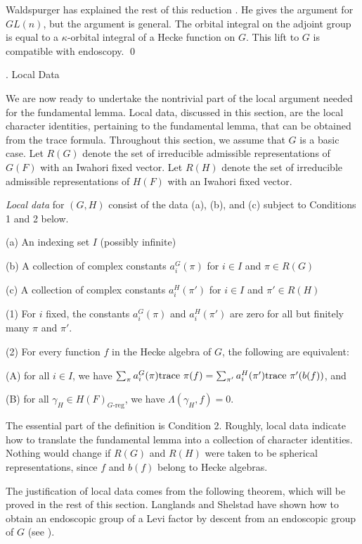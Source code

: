 Waldspurger has explained the rest of this reduction \cite{W,3.1.2}.  He
gives the argument for $GL(n)$, but the argument is general.
The orbital integral on the adjoint group is equal 
to a $\kappa$-orbital integral of a 
Hecke function on $G$.  This lift to $G$ is compatible with endoscopy.
\qed
\enddemo


. Local Data\endhead

We are now ready to undertake the nontrivial part of the local argument
needed for the fundamental lemma. 
Local data, discussed in this section, are the local character
identities,
 pertaining to the fundamental lemma, that can be obtained
from the trace formula.  Throughout this section, we assume
that $G$ is a basic case.
 Let $R(G)$ denote the set of 
 irreducible admissible representations of
 $G(F)$ with an Iwahori fixed vector.  Let $R(H)$ denote the set 
 of irreducible admissible representations of $H(F)$ with an
 Iwahori fixed vector.

  {\it Local data\/}  for $(G,H)$ consist of
 the data (a), (b), and (c) 
subject to Conditions 1 and 2 below.
 \item{(a)} An indexing set $I$ (possibly infinite) 
 \item{(b)} A collection of complex constants $a_i^G(\pi)$ for $i\in I$
 and $\pi\in R(G)$
 \item{(c)} A collection of complex constants $a_i^H(\pi')$ for
 $i\in I$ and $\pi'\in R(H)$
 \item{(1)}
 For $i$ fixed, the constants $a_i^G(\pi)$ and
 $a_i^H(\pi')$ are zero for all but finitely many $\pi$ and $\pi'$.
 \item{(2)} For every function $f$ in the Hecke algebra of $G$,
 the following are equivalent:
 \item{(A)} for all $i\in I$, we have $\sum_\pi a^G_i(\pi)\text{trace\,}\,\pi(f) =
	\sum_{\pi'} a_i^H(\pi')\text{trace\,}\,\pi'(b(f))$, and
\item{(B)} for all $\gamma_H\in H(F)_{G\text{-reg}}$, we have $\Lambda(\gamma_H,f)=0$.
\enddefinition

The essential part of the definition is Condition 2.  Roughly, local
data indicate how to translate the fundamental lemma
into a collection of character identities.
Nothing would change if $R(G)$ and $R(H)$ were
taken to be spherical representations, since $f$ and
$b(f)$ belong to Hecke algebras.



The justification of local data 
comes from the following theorem, which
will be proved in the rest of this section.
Langlands and Shelstad have shown how to obtain
an endoscopic group of a Levi factor by descent from
an endoscopic group of $G$ (see \cite{LS2}).

